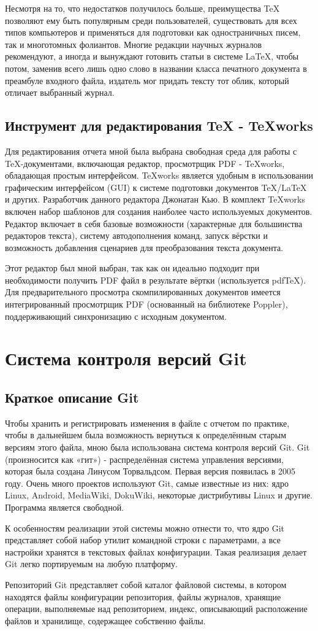 \documentclass[a4paper,14pt]{report} %
\begin{document}
Несмотря на то, что недостатков получилось больше, преимущества TeX позволяют ему быть популярным среди пользователей, существовать для всех типов компьютеров и применяться для подготовки как одностраничных писем, так и многотомных фолиантов. Многие редакции научных журналов рекомендуют, а иногда и вынуждают готовить статьи в системе LaTeX, чтобы потом, заменив всего лишь одно слово в названии класса печатного документа в преамбуле входного файла, издатель мог придать тексту тот облик, который отличает выбранный журнал.
\section{Инструмент для редактирования TeX - TeXworks}
Для редактирования отчета мной была выбрана свободная среда для работы с TeX-документами, включающая редактор, просмотрщик PDF - TeXworks, обладающая простым интерфейсом. TeXworks является удобным в использовании графическим интерфейсом (GUI) к системе подготовки документов TeX/LaTeX и других. Разработчик данного редактора Джонатан Кью. В комплект TeXworks включен набор шаблонов для создания наиболее часто используемых документов. Редактор включает в себя базовые возможности (характерные для большинства редакторов текста), систему автодополнения команд, запуск вёрстки и возможность добавления сценариев для преобразования текста документа.\par
Этот редактор был мной выбран, так как он идеально подходит при необходимости получить PDF файл в результате вёртки (используется pdfTeX). Для предварительного просмотра скомпилированных документов имеется интегрированный просмотрщик PDF (основанный на библиотеке Poppler), поддерживающий синхронизацию с исходным документом.
\chapter{Система контроля версий Git}
\section{Краткое описание Git}
Чтобы хранить и регистрировать изменения в файле с отчетом по практике, чтобы в дальнейшем была возможность вернуться к определённым старым версиям этого файла, мною была использована система контроля версий Git. Git (произносится как «гит») - распределённая система управления версиями, которая была создана Линусом Торвальдсом. Первая версия появилась в 2005 году. Очень много проектов используют Git, самые известные из них: ядро Linux, Android, MediaWiki, DokuWiki,  некоторые дистрибутивы Linux и другие. Программа является свободной. \par
К особенностям реализации этой системы можно отнести то, что ядро Git представляет собой набор утилит командной строки с параметрами, а все настройки хранятся в текстовых файлах конфигурации. Такая реализация делает Git легко портируемым на любую платформу.\par
Репозиторий Git представляет собой каталог файловой системы, в котором находятся файлы конфигурации репозитория, файлы журналов, хранящие операции, выполняемые над репозиторием, индекс, описывающий расположение файлов и хранилище, содержащее собственно файлы. 
\end{document}

